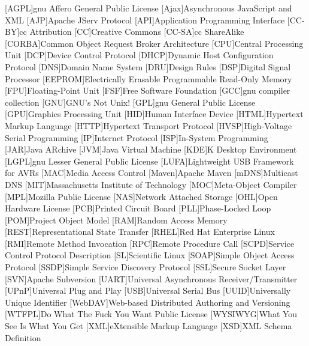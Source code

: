 \begin{acronym}[WYSIWYG]	%
[AGPL]{\acs{gnu} Affero General Public License}
[Ajax]{Asynchronous JavaScript and XML}
[AJP]{Apache JServ Protocol}
[API]{Application Programming Interface}
[CC-BY]{\acl{cc} Attribution}
[CC]{Creative Commons}
[CC-SA]{\acl{cc} ShareAlike}
[CORBA]{Common Object Request Broker Architecture}
[CPU]{Central Processing Unit}
[DCP]{Device Control Protocol}
[DHCP]{Dynamic Host Configuration Protocol}
[DNS]{Domain Name System}
[DRU]{Design Rules}
[DSP]{Digital Signal Processor}
[EEPROM]{Electrically Erasable Programmable Read-Only Memory}
[FPU]{Floating-Point Unit}
[FSF]{Free Software Foundation}
[GCC]{\acs{gnu} compiler collection}
[GNU]{GNU's Not Unix!}
[GPL]{\acs{gnu} General Public License}
[GPU]{Graphics Processing Unit}
[HID]{Human Interface Device}
[HTML]{Hypertext Markup Language}
[HTTP]{Hypertext Transport Protocol}
[HVSP]{High-Voltage Serial Programming}
[IP]{Internet Protocol}
[ISP]{In-System Programming}
[JAR]{Java ARchive}
[JVM]{Java Virtual Machine}
[KDE]{K Desktop Environment}
[LGPL]{\acs{gnu} Lesser General Public License}
[LUFA]{Lightweight USB Framework for AVRs}
[MAC]{Media Access Control}
[Maven]{Apache Maven}
[mDNS]{Multicast DNS}
[MIT]{Massachusetts Institute of Technology}
[MOC]{Meta-Object Compiler}
[MPL]{Mozilla Public License}
[NAS]{Network Attached Storage}
[OHL]{Open Hardware License}
[PCB]{Printed Circuit Board}
[PLL]{Phase-Locked Loop}
[POM]{Project Object Model}
[RAM]{Random Access Memory}
[REST]{Representational State Transfer}
[RHEL]{Red Hat Enterprise Linux}
[RMI]{Remote Method Invocation}
[RPC]{Remote Procedure Call}
[SCPD]{Service Control Protocol Description}
[SL]{Scientific Linux}
[SOAP]{Simple Object Access Protocol}
[SSDP]{Simple Service Discovery Protocol}
[SSL]{Secure Socket Layer}
[SVN]{Apache Subversion}
[UART]{Universal Asynchronous Receiver/Transmitter}
[UPnP]{Universal Plug and Play}
[USB]{Universal Serial Bus}
[UUID]{Universally Unique Identifier}
[WebDAV]{Web-based Distributed Authoring and Versioning}
[WTFPL]{Do What The Fuck You Want Public License}
[WYSIWYG]{What You See Is What You Get}
[XML]{eXtensible Markup Language}
[XSD]{XML Schema Definition}
\end{acronym}
